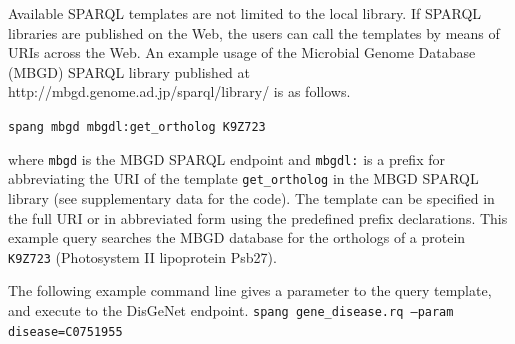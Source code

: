 \documentclass[runningheads]{llncs}
\begin{document}
Available SPARQL templates are not limited to the local library.
If SPARQL libraries are published on the Web, the users can call the templates by means of URIs across the Web.
An example usage of the Microbial Genome Database (MBGD) SPARQL library published at http://mbgd.genome.ad.jp/sparql/library/ is as follows.

\texttt{spang mbgd mbgdl:get\_ortholog K9Z723}

where {\tt mbgd} is the MBGD SPARQL endpoint \citep{Chiba} and \texttt{mbgdl:} is a prefix for abbreviating the URI of the template {\tt get\_ortholog} in the MBGD SPARQL library (see supplementary data for the code). 
The template can be specified in the full URI or in abbreviated form using the predefined prefix declarations.
This example query searches the MBGD database \citep{Uchiyama} for the orthologs of a protein \texttt{K9Z723} (Photosystem II lipoprotein Psb27).

The following example command line gives a parameter to the query template, and execute to the DisGeNet endpoint.
\texttt{spang gene\_disease.rq --param disease=C0751955}



\end{document}
